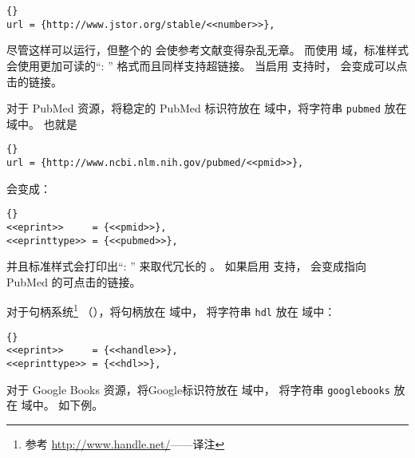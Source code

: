 \begin{lstlisting}[style=bibtex]{}
url = {http://www.jstor.org/stable/<<number>>},
\end{lstlisting}
%
尽管这样可以运行，但整个的  会使参考文献变得杂乱无章。
而使用  域，标准样式会使用更加可读的“: ” 格式而且同样支持超链接。
当启用  支持时， 会变成可以点击的链接。

对于 PubMed 资源，将稳定的 PubMed 标识符放在  域中，将字符串 \texttt{pubmed} 放在  域中。
也就是

\begin{lstlisting}[style=bibtex]{}
url = {http://www.ncbi.nlm.nih.gov/pubmed/<<pmid>>},
\end{lstlisting}
%
会变成：

\begin{lstlisting}[style=bibtex]{}
<<eprint>>     = {<<pmid>>},
<<eprinttype>> = {<<pubmed>>},
\end{lstlisting}
%
并且标准样式会打印出“: ” 来取代冗长的 。
如果启用  支持， 会变成指向 PubMed 的可点击的链接。

对于句柄系统\footnote{%
参考 \url{http://www.handle.net/}——译注}
（），将句柄放在  域中，
将字符串 \texttt{hdl} 放在  域中：

\begin{lstlisting}[style=bibtex]{}
<<eprint>>     = {<<handle>>},
<<eprinttype>> = {<<hdl>>},
\end{lstlisting}
%
对于 Google Books 资源，将Google标识符放在  域中，
将字符串 \texttt{googlebooks} 放在  域中。
如下例。

